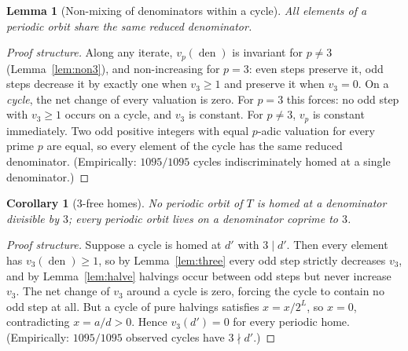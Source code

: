 \documentclass[11pt]{article}
\newtheorem{lemma}[theorem]{Lemma}
\newtheorem{corollary}[theorem]{Corollary}
\theoremstyle{remark}
\DeclareMathOperator{\den}{den}
\newcommand{\vthree}{v_3}
\newcommand{\vP}[1]{v_{#1}}
\begin{document}
\begin{lemma}[Non-mixing of denominators within a cycle]\label{lem:nonmixing}
All elements of a periodic orbit share the same reduced denominator.
\end{lemma}
\begin{proof}[Proof structure]
Along any iterate, \(\vP{p}(\den)\) is invariant for \(p \ne 3\)
(Lemma~\ref{lem:non3}), and non-increasing for \(p = 3\): even steps preserve it,
odd steps decrease it by exactly one when \(\vthree \ge 1\) and preserve it when
\(\vthree = 0\). On a \emph{cycle}, the net change of every valuation is zero.
For \(p = 3\) this forces: no odd step with \(\vthree \ge 1\) occurs on a cycle,
and \(\vthree\) is constant. For \(p \ne 3\), \(\vP{p}\) is constant
immediately. Two odd positive integers with equal \(p\)-adic valuation for
every prime \(p\) are equal, so every element of the cycle has the same reduced
denominator. (Empirically: \(1095/1095\) cycles indiscriminately homed at a
single denominator.)
\end{proof}

\begin{corollary}[3-free homes]\label{cor:threefree}
No periodic orbit of \(T\) is homed at a denominator divisible by \(3\); every
periodic orbit lives on a denominator coprime to \(3\).
\end{corollary}
\begin{proof}[Proof structure]
Suppose a cycle is homed at \(d'\) with \(3 \mid d'\). Then every element has
\(\vthree(\den) \ge 1\), so by Lemma~\ref{lem:three} every odd step strictly
decreases \(\vthree\), and by Lemma~\ref{lem:halve} halvings occur between odd
steps but never increase \(\vthree\). The net change of \(\vthree\) around a
cycle is zero, forcing the cycle to contain no odd step at all. But a cycle of
pure halvings satisfies \(x = x/2^{L}\), so \(x = 0\), contradicting
\(x = a/d > 0\). Hence \(\vthree(d') = 0\) for every periodic home.
(Empirically: \(1095/1095\) observed cycles have \(3 \nmid d'\).)
\end{proof}
\end{document}
